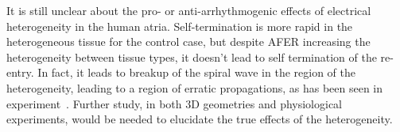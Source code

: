 It is still unclear about the pro- or anti-arrhythmogenic effects of
electrical heterogeneity in the human atria.  Self-termination is more
rapid in the heterogeneous tissue for the control case, but despite AFER
increasing the heterogeneity between tissue types, it doesn't lead to
self termination of the re-entry.  In fact, it leads to breakup of the
spiral wave in the region of the heterogeneity, leading to a region of
erratic propagations, as has been seen in experiment~\cite{Kumagai1997}.
Further study, in both 3D geometries and physiological experiments,
would be needed to elucidate the true effects of the heterogeneity.


